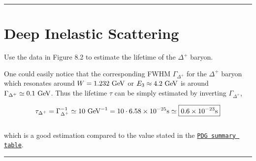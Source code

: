 
\noindent\rule{7in}{2.8pt}
\section{Deep Inelastic Scattering}
    
\begin{problem}{8.1}
Use the data in Figure 8.2 to estimate the lifetime of the $\Delta^+$ baryon.
\end{problem}
\begin{solution}
One could easily notice that the corresponding FWHM $\Gamma_{\Delta^+}$ for the $\Delta^+$ baryon which resonates around $W=1.232\text{ GeV}$ or $E_3 \approx 4.2 \text{ GeV}$ is around $\Gamma_{\Delta^+} \simeq 0.1 \text{ GeV}$. Thus the lifetime $\tau$ can be simply estimated by inverting $\Gamma_{\Delta^+}$, 

\begin{align*}
    \tau_{\Delta^+} = \Gamma_{\Delta^+}^{-1} \simeq 10 \GeV^{-1} = 10 \cdot \num{6.58e-25} \unit{s} \simeq \boxed{ \num{0.6e-23} \unit{s}} 
\end{align*}\\
which is a good estimation compared to the value stated in the \href{https://pdg.lbl.gov/2023/tables/rpp2023-tab-baryons-Delta.pdf}{\texttt{PDG summary table}}.
\end{solution}

\noindent\rule{7in}{1.5pt}


